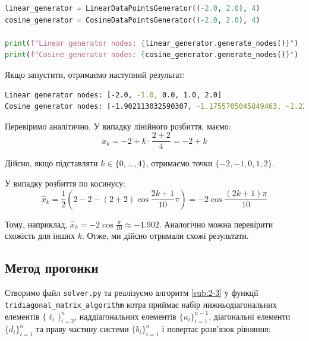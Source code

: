 \documentclass[12pt]{extarticle}
\begin{document}
\begin{lstlisting}[language=Python, caption=Використання генераторів]
linear_generator = LinearDataPointsGenerator((-2.0, 2.0), 4)
cosine_generator = CosineDataPointsGenerator((-2.0, 2.0), 4)

print(f"Linear generator nodes: {linear_generator.generate_nodes()}")
print(f"Cosine generator nodes: {cosine_generator.generate_nodes()}")
\end{lstlisting}

Якщо запустити, отримаємо наступний результат:

\begin{lstlisting}[language=bash, caption=Результат запуску генераторів]
Linear generator nodes: [-2.0, -1.0, 0.0, 1.0, 2.0]
Cosine generator nodes: [-1.902113032590307, -1.1755705045849463, -1.2246467991473532e-16, 1.175570504584946, 1.902113032590307]
\end{lstlisting}

Перевіримо аналітично. У випадку лінійного розбиття, маємо:
\[
x_k = -2 + k \cdot \frac{2+2}{4} = -2 + k
\]

Дійсно, якщо підставляти $k \in \{0,\dots,4\}$, отримаємо точки $\{-2,-1,0,1,2\}$.

У випадку розбиття по косинусу:
\[
\hat{x}_k = \frac{1}{2}\left(2-2-(2+2)\cos \frac{2k+1}{10}\pi\right) = -2 \cos \frac{(2k+1)\pi}{10}
\]

Тому, наприклад, $\hat{x}_0 = -2\cos \frac{\pi}{10} \approx -1.902$. Аналогічно можна перевірити схожість для інших $k$. Отже, ми дійсно отримали схожі результати.

\subsection{Метод прогонки}

Створимо файл \texttt{solver.py} та реалізуємо алгоритм \ref{sub:2-3} у функції \texttt{tridiagonal\_matrix\_algorithm} котра приймає набір нижньодіагональних елементів $\{\ell_i\}_{i=2}^n$, наддіагональних елементів $\{u_i\}_{i=1}^{n-1}$, діагональні елементи $\{d_i\}_{i=1}^n$ та праву частину системи $\{b_i\}_{i=1}^n$ і повертає розв'язок рівняння:
\end{document}
